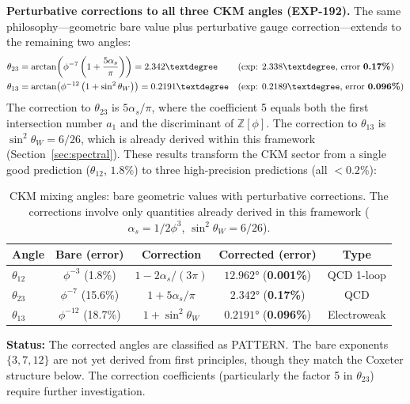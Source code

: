 \documentclass[12pt,a4paper]{article}
\begin{document}
\textbf{Perturbative corrections to all three CKM angles (EXP-192).} The same philosophy---geometric bare value plus perturbative gauge correction---extends to the remaining two angles:
\begin{align}
\theta_{23} &= \arctan\!\left(\phi^{-7}\left(1 + \frac{5\alpha_s}{\pi}\right)\right) = 2.342° && \text{(exp: } 2.338°\text{, error \textbf{0.17\%})} \label{eq:theta23_qcd} \\
\theta_{13} &= \arctan\!\left(\phi^{-12}\left(1 + \sin^2\theta_W\right)\right) = 0.2191° && \text{(exp: } 0.2189°\text{, error \textbf{0.096\%})} \label{eq:theta13_ew}
\end{align}
The correction to $\theta_{23}$ is $5\alpha_s/\pi$, where the coefficient 5 equals both the first intersection number $a_1$ and the discriminant of $\mathbb{Z}[\phi]$. The correction to $\theta_{13}$ is $\sin^2\theta_W = 6/26$, which is already derived within this framework (Section~\ref{sec:spectral}). These results transform the CKM sector from a single good prediction ($\theta_{12}$, $1.8\%$) to three high-precision predictions (all $< 0.2\%$):

\begin{table}[H]
\centering
\begin{tabular}{lcccc}
\toprule
\textbf{Angle} & \textbf{Bare (error)} & \textbf{Correction} & \textbf{Corrected (error)} & \textbf{Type} \\
\midrule
$\theta_{12}$ & $\phi^{-3}$ (1.8\%) & $1 - 2\alpha_s/(3\pi)$ & $12.962°$ (\textbf{0.001\%}) & QCD 1-loop \\
$\theta_{23}$ & $\phi^{-7}$ (15.6\%) & $1 + 5\alpha_s/\pi$ & $2.342°$ (\textbf{0.17\%}) & QCD \\
$\theta_{13}$ & $\phi^{-12}$ (18.7\%) & $1 + \sin^2\theta_W$ & $0.2191°$ (\textbf{0.096\%}) & Electroweak \\
\bottomrule
\end{tabular}
\caption{CKM mixing angles: bare geometric values with perturbative corrections. The corrections involve only quantities already derived in this framework ($\alpha_s = 1/2\phi^3$, $\sin^2\theta_W = 6/26$).}
\label{tab:ckm_corrected}
\end{table}

\textbf{Status:} The corrected angles are classified as PATTERN. The bare exponents $\{3, 7, 12\}$ are not yet derived from first principles, though they match the Coxeter structure below. The correction coefficients (particularly the factor 5 in $\theta_{23}$) require further investigation.
\end{document}
